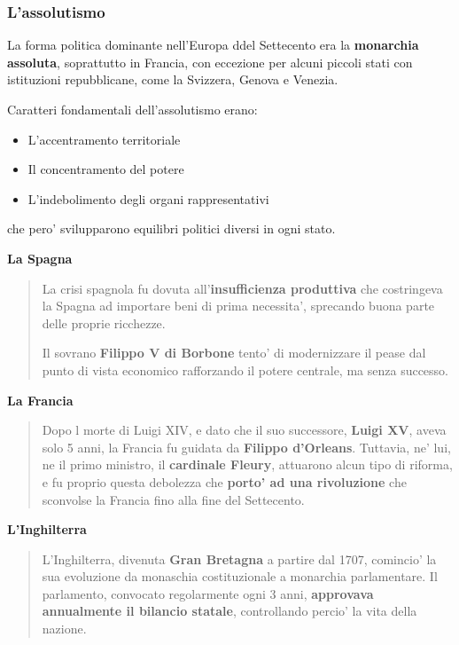 \documentclass{article}
\begin{document}
{{    \subsubsection{L'assolutismo}
    La forma politica dominante nell'Europa ddel Settecento era la \textbf{monarchia assoluta}, soprattutto in Francia, con eccezione per alcuni piccoli stati con istituzioni repubblicane, come la Svizzera, Genova e Venezia.

    Caratteri fondamentali dell'assolutismo erano:

    \begin{itemize}
      \item L'accentramento territoriale
      \item Il concentramento del potere
      \item L'indebolimento degli organi rappresentativi
    \end{itemize}

    che pero' svilupparono equilibri politici diversi in ogni stato.

    \textbf{La Spagna}
    \begin{quote}
      La crisi spagnola fu dovuta all'\textbf{insufficienza produttiva} che costringeva la Spagna ad importare beni di prima necessita', sprecando buona parte delle proprie ricchezze.

      Il sovrano \textbf{Filippo V di Borbone} tento' di modernizzare il pease dal punto di vista economico rafforzando il potere centrale, ma senza successo.
    \end{quote}

    \textbf{La Francia}
    \begin{quote}
      Dopo l morte di Luigi XIV, e dato che il suo successore, \textbf{Luigi XV}, aveva solo 5 anni, la Francia fu guidata da \textbf{Filippo d'Orleans}. Tuttavia, ne' lui, ne il primo ministro, il \textbf{cardinale Fleury}, attuarono alcun tipo di riforma, e fu proprio questa debolezza che \textbf{porto' ad una rivoluzione} che sconvolse la Francia fino alla fine del Settecento.
    \end{quote}

    \textbf{L'Inghilterra}
    \begin{quote}
      L'Inghilterra, divenuta \textbf{Gran Bretagna} a partire dal 1707, comincio' la sua evoluzione da monaschia costituzionale a monarchia parlamentare. Il parlamento, convocato regolarmente ogni 3 anni, \textbf{approvava annualmente il bilancio statale}, controllando percio' la vita della nazione.
    \end{quote}

}}
\end{document}
